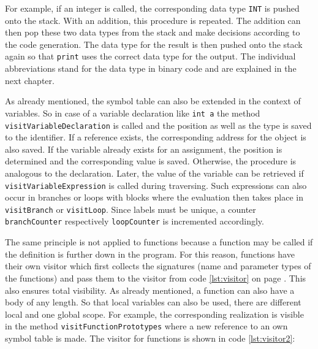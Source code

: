 For example, if an integer is called, the corresponding data type \texttt{INT} is pushed onto the stack. With an addition, this procedure is repeated. The addition can then pop these two data types from the stack and make decisions according to the code generation. The data type for the result is then pushed onto the stack again so that \texttt{print} uses the correct data type for the output. The individual abbreviations stand for the data type in binary code and are explained in the next chapter.

As already mentioned, the symbol table can also be extended in the context of variables. So in case of a variable declaration like \texttt{int a} the method \texttt{visitVariableDeclaration} is called and the position as well as the type is saved to the identifier. If a reference exists, the corresponding address for the object is also saved. If the variable already exists for an assignment, the position is determined and the corresponding value is saved. Otherwise, the procedure is analogous to the declaration. Later, the value of the variable can be retrieved if \texttt{visitVariableExpression} is called during traversing. Such expressions can also occur in branches or loops with blocks where the evaluation then takes place in \texttt{visitBranch} or \texttt{visitLoop}. Since labels must be unique, a counter \texttt{branchCounter} respectively \texttt{loopCounter} is incremented accordingly.

The same principle is not applied to functions because a function may be called if the definition is further down in the program. For this reason, functions have their own visitor which first collects the signatures (name and parameter types of the functions) and pass them to the visitor from code \ref{lst:visitor} on page \pageref{lst:visitor}. This also ensures total visibility. As already mentioned, a function can also have a body of any length. So that local variables can also be used, there are different local and one global scope. For example, the corresponding realization is visible in the method \texttt{visitFunctionPrototypes} where a new reference to an own symbol table is made. The visitor for functions is shown in code \ref{lst:visitor2}:

